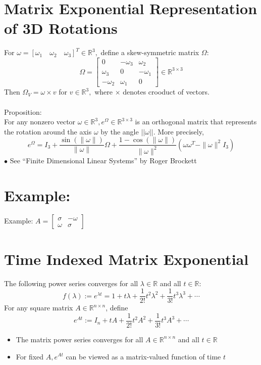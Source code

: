 \documentclass[10pt,a4paper,oneside]{article}
\begin{document}
\section{Matrix Exponential Representation of 3D Rotations}
For $\omega=\left[\omega_{1} \quad \omega_{2} \quad \omega_{3}\right]^{T} \in \mathbb{R}^{3},$ define a skew-symmetric matrix $\Omega$:
\[
\Omega=\left[\begin{array}{ccc}{0} & {-\omega_{3}} & {\omega_{2}} \\ {\omega_{3}} & {0} & {-\omega_{1}} \\ {-\omega_{2}} & {\omega_{1}} & {0}\end{array}\right] \in \mathbb{R}^{3 \times 3}
\]
Then $\Omega_V=\omega \times v$ for $v \in \mathbb{R}^{3},$ where $\times$ denotes crooduct of vectors.\\
\\
Proposition:\\
For any nonzero vector $\omega \in \mathbb{R}^{3}, e^{\Omega} \in \mathbb{R}^{3 \times 3}$ is an orthogonal matrix that represents the rotation around the axis $\omega$ by the angle $||\omega||$.  More precisely,
\[
e^{\Omega}=I_{3}+\frac{\sin (\|\omega\|)}{\|\omega\|} \Omega+\frac{1-\cos (\|\omega\|)}{\|\omega\|^{2}}\left(\omega \omega^{T}-\|\omega\|^{2} I_{3}\right)
\]
$\bullet$ See ``Finite Dimensional Linear Systems'' by Roger Brockett
\section{Example:}
Example: $A=\left[\begin{array}{cc}{\sigma} & {-\omega} \\ {\omega} & {\sigma}\end{array}\right]$
\section{Time Indexed Matrix Exponential}
The following power series converges for all $\lambda \in \mathbb{R}$ and all $t \in \mathbb{R}$:
\[
f(\lambda) :=e^{\lambda t}=1+t \lambda+\frac{1}{2 !} t^{2} \lambda^{2}+\frac{1}{3 !} t^{3} \lambda^{3}+\cdots
\]
For any square matrix $A\in\mathbb{R}^{n\times n}$, define
\[
e^{A t} :=I_{n}+t A+\frac{1}{2 !} t^{2} A^{2}+\frac{1}{3 !} t^{3} A^{3}+\cdots
\]
\begin{itemize}
\item The matrix power series converges for all $A \in \mathbb{R}^{n \times n}$ and all $t \in \mathbb{R}$
\item For fixed $A, e^{A t}$ can be viewed as a matrix-valued function of time $t$
\end{itemize}
\end{document}
